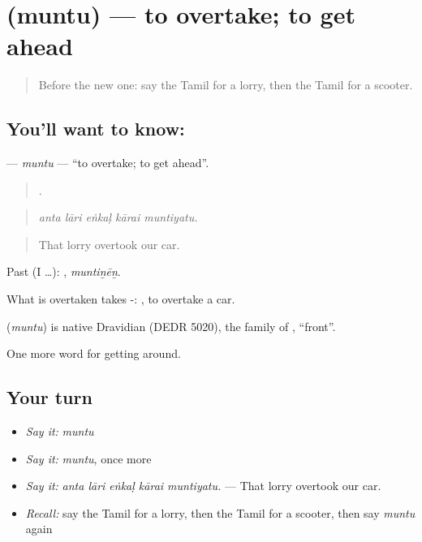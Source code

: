 \section[\texorpdfstring{\ta{முந்து} (muntu)}{முந்து (muntu)}]{ (muntu) — to overtake; to get ahead}

\label{lesson:TA-C404-muntu}



\begin{quote}
Before the new one: say the Tamil for a lorry, then the Tamil for a scooter.
\end{quote}

\subsection*{You'll want to know: }
\textbf{} — \emph{muntu} — \textquotedblleft{}to overtake; to get ahead\textquotedblright{}.

\begin{quote}
    .
\end{quote}

\begin{quote}
\emph{anta lāri eṅkaḷ kārai muntiyatu.}
\end{quote}

\begin{quote}
That lorry overtook our car.
\end{quote}

Past (I …): , \emph{muntiṉēṉ}.

What is overtaken takes -:  , to overtake a car.

\begin{cousinweb}
\textbf{} (\emph{muntu}) is native Dravidian (DEDR 5020), the family of , \textquotedblleft{}front\textquotedblright{}.
\end{cousinweb}

\begin{grammarlens}[title={What you've built}]
One more word for getting around.
\end{grammarlens}

\subsection*{Your turn}
\begin{itemize}
\raggedright
  \item \emph{Say it:} \emph{muntu}
  \item \emph{Say it:} \emph{muntu}, once more
  \item \emph{Say it:} \emph{anta lāri eṅkaḷ kārai muntiyatu.} — That lorry overtook our car.
  \item \emph{Recall:} say the Tamil for a lorry, then the Tamil for a scooter, then say \emph{muntu} again
\end{itemize}

